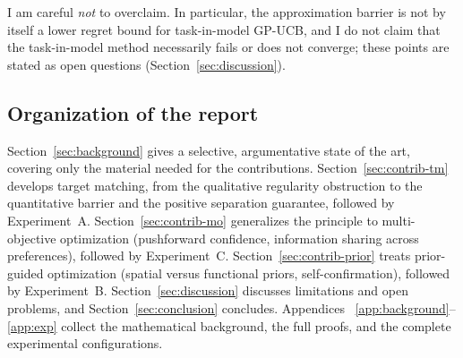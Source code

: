 \noindent I am careful \emph{not} to overclaim. In particular, the approximation
barrier is not by itself a lower regret bound for task-in-model GP-UCB, and I do
not claim that the task-in-model method necessarily fails or does not converge;
these points are stated as open questions
(Section~\ref{sec:discussion}).

\subsection{Organization of the report}
\label{sec:intro-organization}

Section~\ref{sec:background} gives a selective, argumentative state of the art,
covering only the material needed for the contributions. Section~\ref{sec:contrib-tm}
develops target matching, from the qualitative regularity obstruction to the
quantitative barrier and the positive separation guarantee, followed by
Experiment~A. Section~\ref{sec:contrib-mo} generalizes the principle to
multi-objective optimization (pushforward confidence, information sharing across
preferences), followed by Experiment~C. Section~\ref{sec:contrib-prior} treats
prior-guided optimization (spatial versus functional priors, self-confirmation),
followed by Experiment~B. Section~\ref{sec:discussion} discusses limitations and
open problems, and Section~\ref{sec:conclusion} concludes. Appendices~%
\ref{app:background}--\ref{app:exp} collect the mathematical background, the full
proofs, and the complete experimental configurations.

